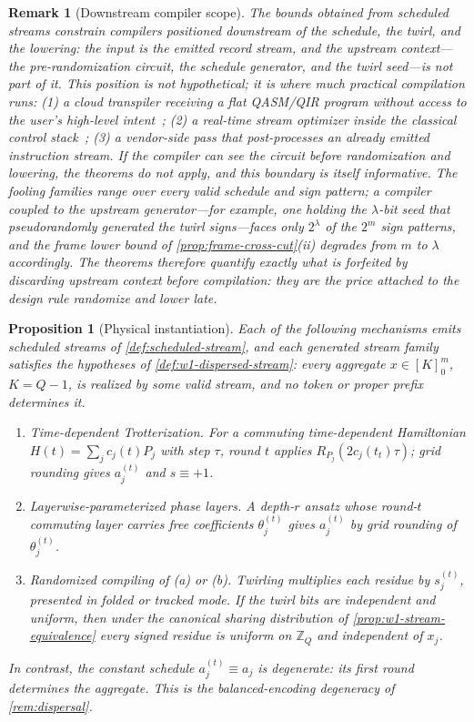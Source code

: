 \documentclass[aps,prx,reprint,floatfix,superscriptaddress]{revtex4-2}
\newtheorem{proposition}{Proposition}
\newtheorem{remark}{Remark}
\begin{document}
\begin{remark}[Downstream compiler scope]
\label{rem:downstream-scope}
The bounds obtained from scheduled streams constrain compilers
positioned \emph{downstream} of the schedule, the twirl, and the
lowering: the input is the emitted record stream, and the upstream
context---the pre-randomization circuit, the schedule generator, and
the twirl seed---is not part of it.  This position is not hypothetical;
it is where much practical compilation runs: (1) a cloud transpiler
receiving a flat QASM/QIR program without access to the user's
high-level intent~\cite{javadi2024qiskit}; (2) a real-time stream
optimizer inside the classical control
stack~\cite{riesebos2017pauli}; (3) a vendor-side pass that
post-processes an already emitted instruction stream.  If the compiler
can see the circuit before randomization and lowering, the theorems do
not apply, and this boundary is itself informative.  The fooling
families range over every valid schedule and sign pattern; a compiler
coupled to the upstream generator---for example, one holding the
$\lambda$-bit seed that pseudorandomly generated the twirl
signs---faces only $2^\lambda$ of the $2^m$ sign patterns, and the
frame lower bound of \cref{prop:frame-cross-cut}(ii) degrades from $m$
to $\lambda$ accordingly.  The theorems therefore quantify exactly what
is forfeited by discarding upstream context before compilation: they
are the price attached to the design rule \emph{randomize and lower
late}.
\end{remark}

\begin{proposition}[Physical instantiation]
\label{prop:physical-instantiation}
Each of the following mechanisms emits scheduled streams of
\cref{def:scheduled-stream}, and each generated stream family satisfies
the hypotheses of \cref{def:w1-dispersed-stream}: every aggregate
$x\in[K]_0^m$, $K=Q-1$, is realized by some valid stream, and no token
or proper prefix determines it.
\begin{enumerate}[leftmargin=1.7em,label=(\alph*)]
\item \emph{Time-dependent Trotterization.}  For a commuting
time-dependent Hamiltonian $H(t)=\sum_jc_j(t)P_j$ with step $\tau$,
round $t$ applies $R_{P_j}(2c_j(t_t)\tau)$; grid rounding gives
$a_j^{(t)}$ and $s\equiv+1$.
\item \emph{Layerwise-parameterized phase layers.}  A depth-$r$ ansatz
whose round-$t$ commuting layer carries free coefficients
$\theta_j^{(t)}$ gives $a_j^{(t)}$ by grid rounding of $\theta_j^{(t)}$.
\item \emph{Randomized compiling of (a) or (b).}  Twirling multiplies
each residue by $s_j^{(t)}$, presented in folded or tracked mode.  If
the twirl bits are independent and uniform, then under the canonical
sharing distribution of \cref{prop:w1-stream-equivalence} every signed
residue is uniform on $\mathbb Z_Q$ and independent of $x_j$.
\end{enumerate}
In contrast, the constant schedule $a_j^{(t)}\equiv a_j$ is degenerate:
its first round determines the aggregate.  This is the balanced-encoding
degeneracy of \cref{rem:dispersal}.
\end{proposition}
\end{document}
